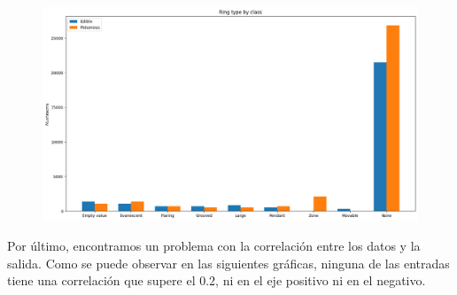 \documentclass[11pt]{article}
\begin{document}
 \begin{figure}[H]
    \begin{center}
    \includegraphics[width=\textwidth]{Results/Analysis/17RingType.png}
    \end{center}
 \end{figure}

Por último, encontramos un problema con la correlación entre los datos y la salida. Como se puede observar en las siguientes gráficas, ninguna de las entradas tiene una correlación que supere el 0.2, ni en el eje positivo ni en el negativo. 
\end{document}
